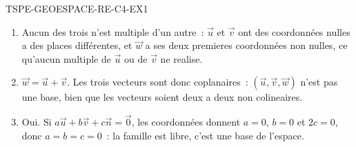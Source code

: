 \begin{corrige}{TSPE-GEOESPACE-RE-C4-EX1}
\begin{enumerate}
  \item Aucun des trois n'est multiple d'un autre~: $\vec{u}$ et $\vec{v}$ ont
        des coordonnées nulles a des places différentes, et $\vec{w}$ a ses
        deux premieres coordonnées non nulles, ce qu'aucun multiple de
        $\vec{u}$ ou de $\vec{v}$ ne realise.
  \item $\vec{w}=\vec{u}+\vec{v}$. Les trois vecteurs sont donc coplanaires~:
        $(\vec{u},\vec{v},\vec{w})$ n'est pas une base, bien que les vecteurs
        soient deux a deux non colineaires.
  \item Oui. Si $a\vec{u}+b\vec{v}+c\vec{n}=\vec{0}$, les coordonnées donnent
        $a=0$, $b=0$ et $2c=0$, donc $a=b=c=0$~: la famille est libre, c'est
        une base de l'espace.
\end{enumerate}
\end{corrige}
